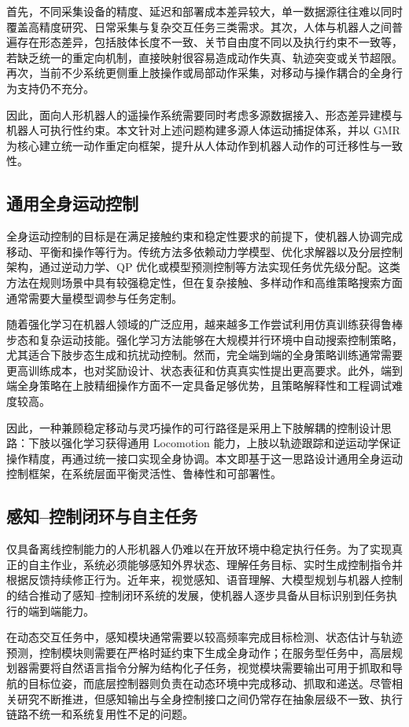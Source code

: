 首先，不同采集设备的精度、延迟和部署成本差异较大，单一数据源往往难以同时覆盖高精度研究、日常采集与复杂交互任务三类需求。其次，人体与机器人之间普遍存在形态差异，包括肢体长度不一致、关节自由度不同以及执行约束不一致等，若缺乏统一的重定向机制，直接映射很容易造成动作失真、轨迹突变或关节超限。再次，当前不少系统更侧重上肢操作或局部动作采集，对移动与操作耦合的全身行为支持仍不充分。

因此，面向人形机器人的遥操作系统需要同时考虑多源数据接入、形态差异建模与机器人可执行性约束。本文针对上述问题构建多源人体运动捕捉体系，并以 GMR 为核心建立统一动作重定向框架，提升从人体动作到机器人动作的可迁移性与一致性。

\subsection{通用全身运动控制}

全身运动控制的目标是在满足接触约束和稳定性要求的前提下，使机器人协调完成移动、平衡和操作等行为。传统方法多依赖动力学模型、优化求解器以及分层控制架构，通过逆动力学、QP 优化或模型预测控制等方法实现任务优先级分配。这类方法在规则场景中具有较强稳定性，但在复杂接触、多样动作和高维策略搜索方面通常需要大量模型调参与任务定制。

随着强化学习在机器人领域的广泛应用，越来越多工作尝试利用仿真训练获得鲁棒步态和复杂运动技能。强化学习方法能够在大规模并行环境中自动搜索控制策略，尤其适合下肢步态生成和抗扰动控制。然而，完全端到端的全身策略训练通常需要更高训练成本，也对奖励设计、状态表征和仿真真实性提出更高要求。此外，端到端全身策略在上肢精细操作方面不一定具备足够优势，且策略解释性和工程调试难度较高。

因此，一种兼顾稳定移动与灵巧操作的可行路径是采用上下肢解耦的控制设计思路：下肢以强化学习获得通用 Locomotion 能力，上肢以轨迹跟踪和逆运动学保证操作精度，再通过统一接口实现全身协调。本文即基于这一思路设计通用全身运动控制框架，在系统层面平衡灵活性、鲁棒性和可部署性。

\subsection{感知--控制闭环与自主任务}

仅具备离线控制能力的人形机器人仍难以在开放环境中稳定执行任务。为了实现真正的自主作业，系统必须能够感知外界状态、理解任务目标、实时生成控制指令并根据反馈持续修正行为。近年来，视觉感知、语音理解、大模型规划与机器人控制的结合推动了感知--控制闭环系统的发展，使机器人逐步具备从目标识别到任务执行的端到端能力。

在动态交互任务中，感知模块通常需要以较高频率完成目标检测、状态估计与轨迹预测，控制模块则需要在严格时延约束下生成全身动作；在服务型任务中，高层规划器需要将自然语言指令分解为结构化子任务，视觉模块需要输出可用于抓取和导航的目标位姿，而底层控制器则负责在动态环境中完成移动、抓取和递送。尽管相关研究不断推进，但感知输出与全身控制接口之间仍常存在抽象层级不一致、执行链路不统一和系统复用性不足的问题。

